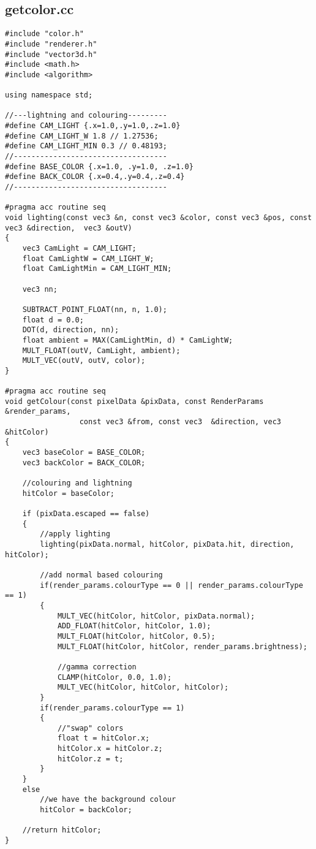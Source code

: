 \documentclass[]{article}
\begin{document}
\subsection{getcolor.cc}
\begin{Verbatim}[fontsize= \footnotesize, tabsize=4]
#include "color.h"
#include "renderer.h"
#include "vector3d.h"
#include <math.h>
#include <algorithm>

using namespace std;

//---lightning and colouring---------
#define CAM_LIGHT {.x=1.0,.y=1.0,.z=1.0}
#define CAM_LIGHT_W 1.8 // 1.27536;
#define CAM_LIGHT_MIN 0.3 // 0.48193;
//-----------------------------------
#define BASE_COLOR {.x=1.0, .y=1.0, .z=1.0}
#define BACK_COLOR {.x=0.4,.y=0.4,.z=0.4}
//-----------------------------------

#pragma acc routine seq
void lighting(const vec3 &n, const vec3 &color, const vec3 &pos, const vec3 &direction,  vec3 &outV)
{
	vec3 CamLight = CAM_LIGHT;
	float CamLightW = CAM_LIGHT_W;
	float CamLightMin = CAM_LIGHT_MIN;

	vec3 nn;

	SUBTRACT_POINT_FLOAT(nn, n, 1.0);
	float d = 0.0;
	DOT(d, direction, nn);
	float ambient = MAX(CamLightMin, d) * CamLightW;
	MULT_FLOAT(outV, CamLight, ambient);
	MULT_VEC(outV, outV, color);
}

#pragma acc routine seq
void getColour(const pixelData &pixData, const RenderParams &render_params,
				 const vec3 &from, const vec3  &direction, vec3  &hitColor)
{
	vec3 baseColor = BASE_COLOR;
	vec3 backColor = BACK_COLOR;

	//colouring and lightning
	hitColor = baseColor;

	if (pixData.escaped == false)
	{
		//apply lighting
		lighting(pixData.normal, hitColor, pixData.hit, direction, hitColor);

		//add normal based colouring
		if(render_params.colourType == 0 || render_params.colourType == 1)
		{
			MULT_VEC(hitColor, hitColor, pixData.normal);
			ADD_FLOAT(hitColor, hitColor, 1.0);
			MULT_FLOAT(hitColor, hitColor, 0.5);
			MULT_FLOAT(hitColor, hitColor, render_params.brightness);

			//gamma correction
			CLAMP(hitColor, 0.0, 1.0);
			MULT_VEC(hitColor, hitColor, hitColor);
		}
		if(render_params.colourType == 1)
		{
			//"swap" colors
			float t = hitColor.x;
			hitColor.x = hitColor.z;
			hitColor.z = t;
		}
	}
	else
		//we have the background colour
		hitColor = backColor;

	//return hitColor;
}
\end{Verbatim}
\end{document}
